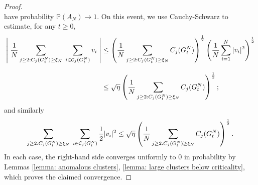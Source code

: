\begin{proof}
\begin{equation}
    \end{equation} have probability $\mathbb{P}(A_N)\rightarrow 1$. On this event, we use Cauchy-Schwarz to estimate, for any $t\ge 0$, \begin{equation}\begin{split} \label{eq: use of CS 1}\left|\hspace{0.1cm}\frac{1}{N}\sum_{j\geq 2: C_j(G^N_t)\geq \xi_N} \hspace{0.1cm}\sum_{i \in \mathcal{C}_j(G^N_t)} v_i \hspace{0.1cm}\right| & \leq \left(\frac{1}{N}\sum_{j\geq 2: C_j(G^N_t)\geq \xi_N} C_j(G^N_t)\right)^\frac{1}{2}\left(\frac{1}{N}\sum_{i=1}^N |v_i|^2\right)^\frac{1}{2} \\[2ex] & \le  \sqrt{\eta}\left(\frac{1}{N}\sum_{j\geq 2: C_j(G^N_t)\geq \xi_N} C_j(G^N_t)\right)^\frac{1}{2}; \end{split} \end{equation} and similarly \begin{equation} \label{eq: use of CS 2} \begin{split} \sum_{j\geq 2: C_j(G^N_t)\geq \xi_N} \hspace{0.1cm}\sum_{i \in \mathcal{C}_j(G^N_t)} \frac{1}{2}|v_i|^2 \leq \sqrt{\eta}\left(\frac{1}{N}\sum_{j\geq 2: C_j(G^N_t)\geq \xi_N} C_j(G^N_t)\right)^\frac{1}{2}. \end{split}\end{equation} In each case, the right-hand side converges uniformly to $0$ in probability by Lemmas \ref{lemma: anomalous clusters}, \ref{lemma: large clusters below criticality}, which proves the claimed convergence. \end{proof} 

